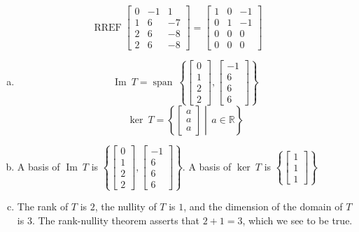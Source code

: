 \begin{exerciseAnswer} 


\[\operatorname{RREF} \left[\begin{array}{ccc}
0 & -1 & 1 \\
1 & 6 & -7 \\
2 & 6 & -8 \\
2 & 6 & -8
\end{array}\right] = \left[\begin{array}{ccc}
1 & 0 & -1 \\
0 & 1 & -1 \\
0 & 0 & 0 \\
0 & 0 & 0
\end{array}\right] \]


\begin{enumerate}[(a)]
\item \[\operatorname{Im}\ T = \operatorname{span}\  \left\{ \left[\begin{array}{c}
0 \\
1 \\
2 \\
2
\end{array}\right] , \left[\begin{array}{c}
-1 \\
6 \\
6 \\
6
\end{array}\right] \right\} \]\[\operatorname{ker}\ T =  \left\{ \left[\begin{array}{c}
a \\
a \\
a
\end{array}\right] \middle|\,a\in\mathbb{R}\right\} \]
\item  A basis of \(\operatorname{Im}\ T\) is \( \left\{ \left[\begin{array}{c}
0 \\
1 \\
2 \\
2
\end{array}\right] , \left[\begin{array}{c}
-1 \\
6 \\
6 \\
6
\end{array}\right] \right\} \). A basis of \(\operatorname{ker}\ T\) is \( \left\{ \left[\begin{array}{c}
1 \\
1 \\
1
\end{array}\right] \right\} \)
\item  The rank of \(T\) is \( 2 \), the nullity of \(T\) is \( 1 \), and the dimension of the domain of \(T\) is \( 3 \). The rank-nullity theorem asserts that \( 2 + 1 = 3 \), which we see to be true. 
\end{enumerate}
    
\end{exerciseAnswer}
    
